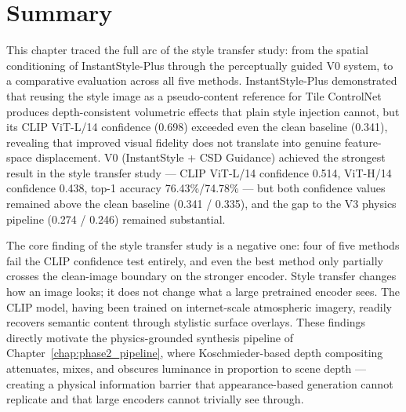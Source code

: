 \section{Summary}
\label{sec:phase1_summary}

\noindent This chapter traced the full arc of the style transfer study: from the spatial conditioning of InstantStyle-Plus through the perceptually guided V0 system, to a comparative evaluation across all five methods.
InstantStyle-Plus demonstrated that reusing the style image as a pseudo-content reference for Tile ControlNet produces depth-consistent volumetric effects that plain style injection cannot, but its CLIP ViT-L/14 confidence (0.698) exceeded even the clean baseline (0.341), revealing that improved visual fidelity does not translate into genuine feature-space displacement.
V0 (InstantStyle + CSD Guidance) achieved the strongest result in the style transfer study --- CLIP ViT-L/14 confidence 0.514, ViT-H/14 confidence 0.438, top-1 accuracy 76.43\%/74.78\% --- but both confidence values remained above the clean baseline (0.341 / 0.335), and the gap to the V3 physics pipeline (0.274 / 0.246) remained substantial.

\noindent The core finding of the style transfer study is a negative one: four of five methods fail the CLIP confidence test entirely, and even the best method only partially crosses the clean-image boundary on the stronger encoder.
Style transfer changes how an image looks; it does not change what a large pretrained encoder sees.
The CLIP model, having been trained on internet-scale atmospheric imagery, readily recovers semantic content through stylistic surface overlays.
These findings directly motivate the physics-grounded synthesis pipeline of Chapter~\ref{chap:phase2_pipeline}, where Koschmieder-based depth compositing attenuates, mixes, and obscures luminance in proportion to scene depth --- creating a physical information barrier that appearance-based generation cannot replicate and that large encoders cannot trivially see through.
